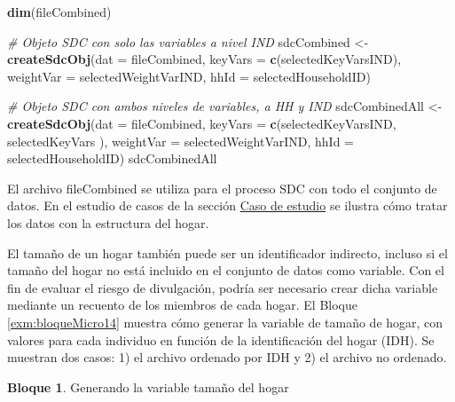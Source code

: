 \documentclass[]{book}
\newenvironment{Shaded}{\begin{snugshade}}{\end{snugshade}}
\newcommand{\CommentTok}[1]{\textcolor[rgb]{0.56,0.35,0.01}{\textit{#1}}}
\newcommand{\DataTypeTok}[1]{\textcolor[rgb]{0.13,0.29,0.53}{#1}}
\newcommand{\KeywordTok}[1]{\textcolor[rgb]{0.13,0.29,0.53}{\textbf{#1}}}
\newcommand{\NormalTok}[1]{#1}
\newcommand{\StringTok}[1]{\textcolor[rgb]{0.31,0.60,0.02}{#1}}
\theoremstyle{definition}
\theoremstyle{definition}
\newtheorem{example}{Bloque}[chapter]
\theoremstyle{definition}
\theoremstyle{definition}
\theoremstyle{remark}
\begin{document}
\begin{Shaded}
\begin{Highlighting}[]
\KeywordTok{dim}\NormalTok{(fileCombined)}

\CommentTok{# Objeto SDC con solo las variables a nivel IND}
\NormalTok{sdcCombined <-}\StringTok{ }\KeywordTok{createSdcObj}\NormalTok{(}\DataTypeTok{dat =}\NormalTok{ fileCombined, }\DataTypeTok{keyVars =} \KeywordTok{c}\NormalTok{(selectedKeyVarsIND),}
                            \DataTypeTok{weightVar =}\NormalTok{ selectedWeightVarIND, }\DataTypeTok{hhId =}\NormalTok{ selectedHouseholdID)}

\CommentTok{# Objeto SDC con ambos niveles de variables, a HH y IND}
\NormalTok{sdcCombinedAll <-}\StringTok{ }\KeywordTok{createSdcObj}\NormalTok{(}\DataTypeTok{dat =}\NormalTok{ fileCombined,}
                               \DataTypeTok{keyVars =} \KeywordTok{c}\NormalTok{(selectedKeyVarsIND, selectedKeyVars ),}
                               \DataTypeTok{weightVar =}\NormalTok{ selectedWeightVarIND, }
                               \DataTypeTok{hhId =}\NormalTok{ selectedHouseholdID)}
\NormalTok{sdcCombinedAll}
\end{Highlighting}
\end{Shaded}

El archivo fileCombined se utiliza para el proceso SDC con todo el conjunto de datos. En el estudio de casos de la sección \protect\hyperlink{caso-de-estudio}{Caso de estudio} se ilustra cómo tratar los datos con la estructura del hogar.

El tamaño de un hogar también puede ser un identificador indirecto, incluso si el tamaño del hogar no está incluido en el conjunto de datos como variable. Con el fin de evaluar el riesgo de divulgación, podría ser necesario crear dicha variable mediante un recuento de los miembros de cada hogar. El Bloque \ref{exm:bloqueMicro14} muestra cómo generar la variable de tamaño de hogar, con valores para cada individuo en función de la identificación del hogar (IDH). Se muestran dos casos: 1) el archivo ordenado por IDH y 2) el archivo no ordenado.

\begin{example}
\protect\hypertarget{exm:bloqueMicro14}{}{\label{exm:bloqueMicro14} }Generando la variable tamaño del hogar
\end{example}
\end{document}
